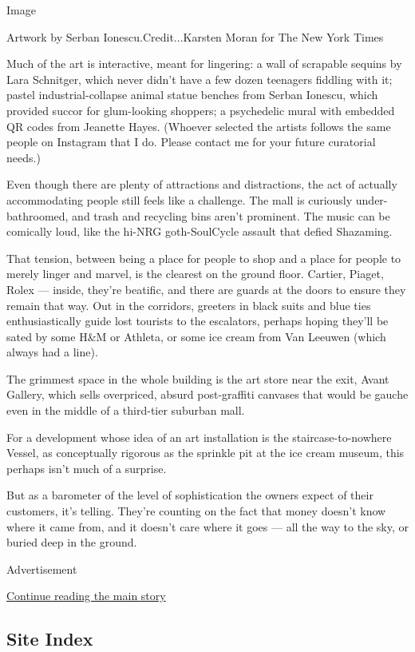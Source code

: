 Image

Artwork by Serban Ionescu.Credit...Karsten Moran for The New York Times

Much of the art is interactive, meant for lingering: a wall of scrapable
sequins by Lara Schnitger, which never didn't have a few dozen teenagers
fiddling with it; pastel industrial-collapse animal statue benches from
Serban Ionescu, which provided succor for glum-looking shoppers; a
psychedelic mural with embedded QR codes from Jeanette Hayes. (Whoever
selected the artists follows the same people on Instagram that I do.
Please contact me for your future curatorial needs.)

Even though there are plenty of attractions and distractions, the act of
actually accommodating people still feels like a challenge. The mall is
curiously under-bathroomed, and trash and recycling bins aren't
prominent. The music can be comically loud, like the hi-NRG
goth-SoulCycle assault that defied Shazaming.

That tension, between being a place for people to shop and a place for
people to merely linger and marvel, is the clearest on the ground floor.
Cartier, Piaget, Rolex --- inside, they're beatific, and there are
guards at the doors to ensure they remain that way. Out in the
corridors, greeters in black suits and blue ties enthusiastically guide
lost tourists to the escalators, perhaps hoping they'll be sated by some
H\&M or Athleta, or some ice cream from Van Leeuwen (which always had a
line).

The grimmest space in the whole building is the art store near the exit,
Avant Gallery, which sells overpriced, absurd post-graffiti canvases
that would be gauche even in the middle of a third-tier suburban mall.

For a development whose idea of an art installation is the
staircase-to-nowhere Vessel, as conceptually rigorous as the sprinkle
pit at the ice cream museum, this perhaps isn't much of a surprise.

But as a barometer of the level of sophistication the owners expect of
their customers, it's telling. They're counting on the fact that money
doesn't know where it came from, and it doesn't care where it goes ---
all the way to the sky, or buried deep in the ground.

Advertisement

\protect\hyperlink{after-bottom}{Continue reading the main story}

\hypertarget{site-index}{%
\subsection{Site Index}\label{site-index}}


